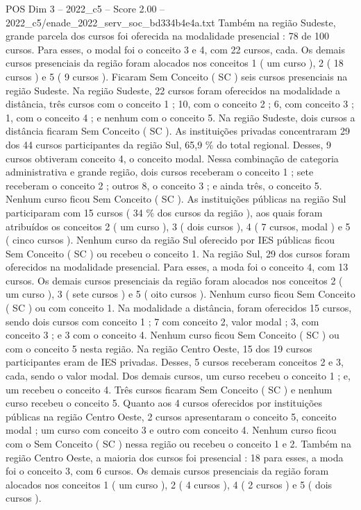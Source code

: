 \begin{textsample}{POS Dim 3 – 2022\_c5 – Score 2.00 – 2022\_c5/enade\_2022\_serv\_soc\_bd334b4e4a.txt}
Também na região Sudeste, grande parcela dos cursos foi oferecida na modalidade presencial : 78 de 100 cursos.
Para esses, o modal foi o conceito 3 e 4, com 22 cursos, cada.
Os demais cursos presenciais da região foram alocados nos conceitos 1 ( um curso ), 2 ( 18 cursos ) e 5 ( 9 cursos ).
Ficaram Sem Conceito ( SC ) seis cursos presenciais na região Sudeste.
Na região Sudeste, 22 cursos foram oferecidos na modalidade a distância, três cursos com o conceito 1 ; 10, com o conceito 2 ; 6, com conceito 3 ; 1, com o conceito 4 ; e nenhum com o conceito 5.
Na região Sudeste, dois cursos a distância ficaram Sem Conceito ( SC ).
As instituições privadas concentraram 29 dos 44 cursos participantes da região Sul, 65,9 \% do total regional.
Desses, 9 cursos obtiveram conceito 4, o conceito modal.
Nessa combinação de categoria administrativa e grande região, dois cursos receberam o conceito 1 ; sete receberam o conceito 2 ; outros 8, o conceito 3 ; e ainda três, o conceito 5.
Nenhum curso ficou Sem Conceito ( SC ).
As instituições públicas na região Sul participaram com 15 cursos ( 34 \% dos cursos da região ), aos quais foram atribuídos os conceitos 2 ( um curso ), 3 ( dois cursos ), 4 ( 7 cursos, modal ) e 5 ( cinco cursos ).
Nenhum curso da região Sul oferecido por IES públicas ficou Sem Conceito ( SC ) ou recebeu o conceito 1.
Na região Sul, 29 dos cursos foram oferecidos na modalidade presencial.
Para esses, a moda foi o conceito 4, com 13 cursos.
Os demais cursos presenciais da região foram alocados nos conceitos 2 ( um curso ), 3 ( sete cursos ) e 5 ( oito cursos ).
Nenhum curso ficou Sem Conceito ( SC ) ou com conceito 1.
Na modalidade a distância, foram oferecidos 15 cursos, sendo dois cursos com conceito 1 ; 7 com conceito 2, valor modal ; 3, com conceito 3 ; e 3 com o conceito 4.
Nenhum curso ficou Sem Conceito ( SC ) ou com o conceito 5 nesta região.
Na região Centro Oeste, 15 dos 19 cursos participantes eram de IES privadas.
Desses, 5 cursos receberam conceitos 2 e 3, cada, sendo o valor modal.
Dos demais cursos, um curso recebeu o conceito 1 ; e, um recebeu o conceito 4.
Três cursos ficaram Sem Conceito ( SC ) e nenhum curso recebeu o conceito 5.
Quanto aos 4 cursos oferecidos por instituições públicas na região Centro Oeste, 2 cursos apresentaram o conceito 5, conceito modal ; um curso com conceito 3 e outro com conceito 4.
Nenhum curso ficou com o Sem Conceito ( SC ) nessa região ou recebeu o conceito 1 e 2.
Também na região Centro Oeste, a maioria dos cursos foi presencial : 18 para esses, a moda foi o conceito 3, com 6 cursos.
Os demais cursos presenciais da região foram alocados nos conceitos 1 ( um curso ), 2 ( 4 cursos ), 4 ( 2 cursos ) e 5 ( dois cursos ).

\end{textsample}
